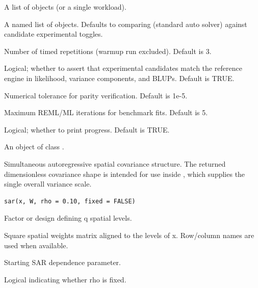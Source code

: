\documentclass[a4paper]{book}
\begin{document}
\begin{Arguments}
\begin{ldescription}
\item[\code{workloads}] A list of  objects (or a single workload).

\item[\code{engines}] A named list of  objects. Defaults to comparing
 (standard auto solver) against candidate experimental toggles.

\item[\code{replications}] Number of timed repetitions (warmup run excluded). Default is 3.

\item[\code{verifyParity}] Logical; whether to assert that experimental candidates match the reference
engine in likelihood, variance components, and BLUPs. Default is TRUE.

\item[\code{tolerance}] Numerical tolerance for parity verification. Default is 1e-5.

\item[\code{nIters}] Maximum REML/ML iterations for benchmark fits. Default is 5.

\item[\code{verbose}] Logical; whether to print progress. Default is TRUE.
\end{ldescription}
\end{Arguments}
%
\begin{Value}
An object of class .
\end{Value}
%
\begin{Description}\relax
Simultaneous autoregressive spatial covariance structure. The returned dimensionless covariance shape is intended for use inside , which supplies the single overall variance scale.
\end{Description}
%
\begin{Usage}
\begin{verbatim}
sar(x, W, rho = 0.10, fixed = FALSE)
\end{verbatim}
\end{Usage}
%
\begin{Arguments}
\begin{ldescription}
\item[\code{x}] Factor or design defining q spatial levels.
\item[\code{W}] Square spatial weights matrix aligned to the levels of x.  Row/column names are used when available.
\item[\code{rho}] Starting SAR dependence parameter.
\item[\code{fixed}] Logical indicating whether rho is fixed.
\end{ldescription}
\end{Arguments}
\end{document}
